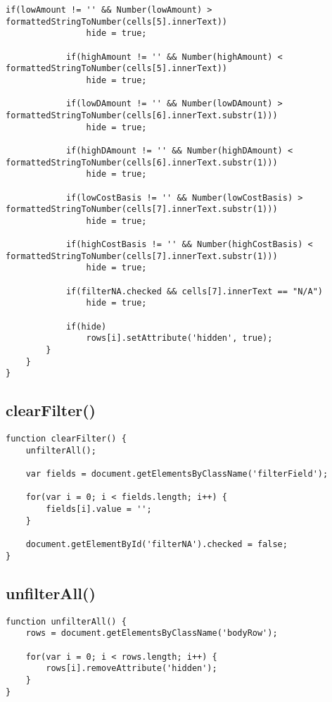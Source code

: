 \documentclass[letterpaper]{article}
\begin{document}
\begin{lstlisting}[firstnumber=512]
            if(lowAmount != '' && Number(lowAmount) > formattedStringToNumber(cells[5].innerText))
                hide = true;

            if(highAmount != '' && Number(highAmount) < formattedStringToNumber(cells[5].innerText))
                hide = true;

            if(lowDAmount != '' && Number(lowDAmount) > formattedStringToNumber(cells[6].innerText.substr(1)))
                hide = true;

            if(highDAmount != '' && Number(highDAmount) < formattedStringToNumber(cells[6].innerText.substr(1)))
                hide = true;

            if(lowCostBasis != '' && Number(lowCostBasis) > formattedStringToNumber(cells[7].innerText.substr(1)))
                hide = true;

            if(highCostBasis != '' && Number(highCostBasis) < formattedStringToNumber(cells[7].innerText.substr(1)))
                hide = true;

            if(filterNA.checked && cells[7].innerText == "N/A")
                hide = true;

            if(hide)
                rows[i].setAttribute('hidden', true);
        }
    }
}
\end{lstlisting}

\subsection{clearFilter()}

\begin{lstlisting}[firstnumber=585]
function clearFilter() {
    unfilterAll();

    var fields = document.getElementsByClassName('filterField');

    for(var i = 0; i < fields.length; i++) {
        fields[i].value = '';
    }

    document.getElementById('filterNA').checked = false;
}
\end{lstlisting}

\subsection{unfilterAll()}

\begin{lstlisting}[firstnumber=597]
function unfilterAll() {
    rows = document.getElementsByClassName('bodyRow');

    for(var i = 0; i < rows.length; i++) {
        rows[i].removeAttribute('hidden');
    }
}
\end{lstlisting}
\end{document}
